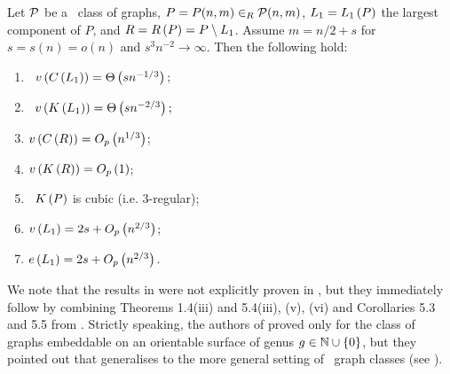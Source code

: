 \begin{thm}\label{CBthm:internal_structure}
Let $\mathcal{P}$ be a \pl\ class of graphs, $P=P(n,m) \in_R \mathcal {P}(n,m)$, $L_1=L_1\left(P\right)$ the largest component of $P$, and $R=R\left(P\right)=P\setminus L_1$. Assume $m=n/2+s$ for $s=s(n)=o(n)$ and $s^3n^{-2} \to \infty$. Then the following hold:
	\begin{enumerate}
		\item \label{CBthm:internal_structure_a}
		\whp\ $v\left({C\left(L_1\right)}\right)=\Theta\left(sn^{-1/3}\right);$
		\item \label{CBthm:internal_structure_b}
		\whp\ $v\left({K\left(L_1\right)}\right)=\Theta\left(sn^{-2/3}\right);$
		\item \label{CBthm:internal_structure_c}
		$v\left({C\left({R}\right)}\right)=O_p\left(n^{1/3}\right)$;
		\item \label{CBthm:internal_structure_d}
		$v\left({K\left({R}\right)}\right)=O_p\left(1\right)$;	
		\item \label{CBthm:internal_structure_e}
		\whp\ $K\left(P\right)$ is cubic (i.e. 3-regular);
		\item \label{CBthm:internal_structure_f}
		$v\left({L_1}\right)=2s+O_p\left(n^{2/3}\right)$;
		\item \label{CBthm:internal_structure_g}
		$e\left({L_1}\right)=2s+O_p\left(n^{2/3}\right)$.	
	\end{enumerate}
\end{thm}

We note that the results in  were not explicitly proven in \cite{KangMosshammerSpruessel2020}, but they immediately follow by combining Theorems 1.4(iii) and 5.4(iii), (v), (vi) and Corollaries 5.3 and 5.5 from \cite{KangMosshammerSpruessel2020}. Strictly speaking, the authors of \cite{KangMosshammerSpruessel2020} proved  only for the class of graphs embeddable on an orientable surface of genus $g \in \mathbb{N}\cup\{0\}$, but they pointed out that  generalises to the more general setting of \pl\ graph classes (see \cite[Remark 8.3]{KangMosshammerSpruessel2020}).

